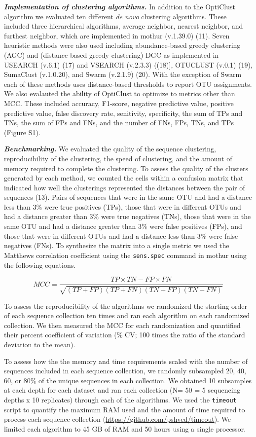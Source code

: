 \documentclass[11pt,]{article}
\begin{document}
\textbf{\emph{Implementation of clustering algorithms.}} In addition to
the OptiClust algorithm we evaluated ten different \emph{de novo}
clustering algorithms. These included three hierarchical algorithms,
average neighbor, nearest neighbor, and furthest neighbor, which are
implemented in mothur (v.1.39.0) (11). Seven heuristic methods were also
used including abundance-based greedy clustering (AGC) and
(distance-based greedy clustering) DGC as implemented in USEARCH (v.6.1)
(17) and VSEARCH (v.2.3.3) ((18){]}, OTUCLUST (v.0.1) (19), SumaClust
(v.1.0.20), and Swarm (v.2.1.9) (20). With the exception of Swarm each
of these methods uses distance-based thresholds to report OTU
assignments. We also evalauted the ability of OptiClust to optimize to
metrics other than MCC. These included accuracy, F1-score, negative
predictive value, positive predictive value, false discovery rate,
senitivity, specificity, the sum of TPs and TNs, the sum of FPs and FNs,
and the number of FNs, FPs, TNs, and TPs (Figure S1).

\textbf{\emph{Benchmarking.}} We evaluated the quality of the sequence
clustering, reproducibility of the clustering, the speed of clustering,
and the amount of memory required to complete the clustering. To assess
the quality of the clusters generated by each method, we counted the
cells within a confusion matrix that indicated how well the clusterings
represented the distances between the pair of sequences (13). Pairs of
sequences that were in the same OTU and had a distance less than 3\%
were true positives (TPs), those that were in different OTUs and had a
distance greater than 3\% were true negatives (TNs), those that were in
the same OTU and had a distance greater than 3\% were false positives
(FPs), and those that were in different OTUs and had a distance less
than 3\% were false negatives (FNs). To synthesize the matrix into a
single metric we used the Matthews correlation coefficient using the
\texttt{sens.spec} command in mothur using the following equations.

\[
MCC = \frac{TP \times TN-FP \times FN}{\sqrt{(TP+FP)(TP+FN)(TN+FP)(TN+FN)} }
\]

To assess the reproducibility of the algorithms we randomized the
starting order of each sequence collection ten times and ran each
algorithm on each randomized collection. We then measured the MCC for
each randomization and quantified their percent coefficient of variation
(\% CV; 100 times the ratio of the standard deviation to the mean).

To assess how the the memory and time requirements scaled with the
number of sequences included in each sequence collection, we randomly
subsampled 20, 40, 60, or 80\% of the unique sequences in each
collection. We obtained 10 subsamples at each depth for each dataset and
ran each collection (N= 50 = 5 sequencing depths x 10 replicates)
through each of the algorithms. We used the \texttt{timeout} script to
quantify the maximum RAM used and the amount of time required to process
each sequence collection (\url{https://github.com/pshved/timeout}). We
limited each algorithm to 45 GB of RAM and 50 hours using a single
processor.
\end{document}
